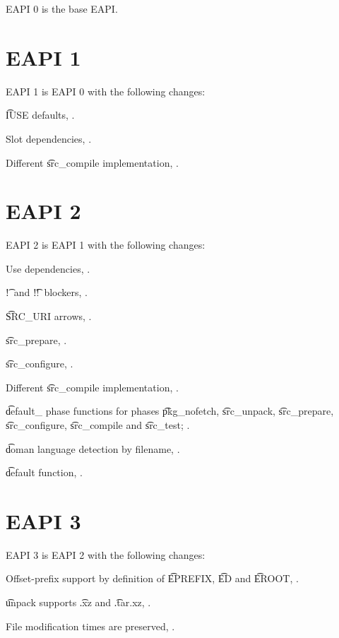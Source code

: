 EAPI 0 is the base EAPI.

\section*{EAPI 1}

EAPI 1 is EAPI 0 with the following changes:

\begin{compactitem}
\item \t{IUSE} defaults, .
\item Slot dependencies, .
\item Different \t{src\_compile} implementation, .
\end{compactitem}

\section*{EAPI 2}

EAPI 2 is EAPI 1 with the following changes:

\begin{compactitem}
\item Use dependencies, .
\item \t{!}\ and \t{!!}\ blockers, .
\item \t{SRC\_URI} arrows, .
\item \t{src\_prepare}, .
\item \t{src\_configure}, .
\item Different \t{src\_compile} implementation, .
\item \t{default\_} phase functions for phases \t{pkg\_nofetch}, \t{src\_unpack}, \t{src\_prepare},
    \t{src\_configure}, \t{src\_compile} and \t{src\_test}; .
\item \t{doman} language detection by filename, .
\item \t{default} function, .
\end{compactitem}

\section*{EAPI 3}

EAPI 3 is EAPI 2 with the following changes:
\begin{compactitem}
\item Offset-prefix support by definition of \t{EPREFIX}, \t{ED} and \t{EROOT},
    .
\item \t{unpack} supports \t{.xz} and \t{.tar.xz}, .
\item File modification times are preserved, .
\end{compactitem}

